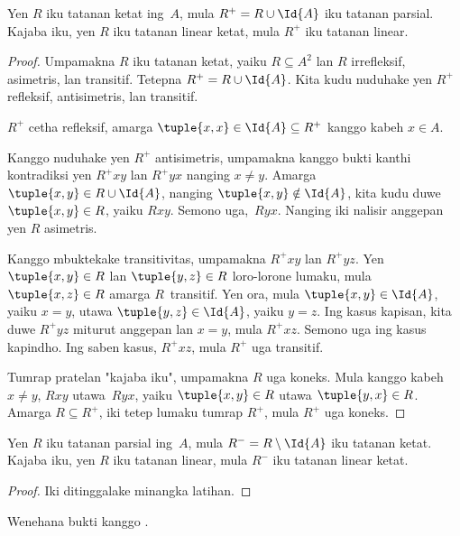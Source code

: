 \documentclass[../../../include/open-logic-section]{subfiles}
\begin{document}
\begin{prop}
Yen $R$ iku tatanan ketat ing~$A$,
mula $R^+ = R \cup \Id{A}$ iku tatanan parsial.
Kajaba iku, yen $R$ iku tatanan linear ketat,
mula $R^+$ iku tatanan linear.
\end{prop}

\begin{proof}
Umpamakna $R$ iku tatanan ketat, yaiku
$R \subseteq A^2$ lan $R$ irrefleksif,
asimetris, lan transitif.
Tetepna $R^+ = R \cup \Id{A}$.
Kita kudu nuduhake yen $R^+$ refleksif,
antisimetris, lan transitif.

$R^+$ cetha refleksif, amarga
$\tuple{x, x} \in \Id{A} \subseteq R^+$
kanggo kabeh $x \in A$.

Kanggo nuduhake yen $R^+$ antisimetris,
umpamakna kanggo bukti kanthi kontradiksi yen
$R^+xy$ lan $R^+yx$ nanging $x \neq y$.
Amarga $\tuple{x,y} \in R \cup \Id{A}$,
nanging $\tuple{x, y} \notin \Id{A}$,
kita kudu duwe $\tuple{x, y} \in R$, yaiku $Rxy$.
Semono uga,~$Ryx$.
Nanging iki nalisir anggepan yen $R$ asimetris.

Kanggo mbuktekake transitivitas, umpamakna
$R^+xy$ lan $R^+yz$.
Yen $\tuple{x, y} \in R$ lan $\tuple{y,z} \in R$
loro-lorone lumaku, mula $\tuple{x, z} \in R$
amarga $R$~transitif.
Yen ora, mula $\tuple{x, y} \in\Id{A}$,
yaiku $x = y$, utawa $\tuple{y, z} \in \Id{A}$,
yaiku $y = z$.
Ing kasus kapisan, kita duwe $R^+yz$ miturut
anggepan lan $x = y$, mula $R^+xz$.
Semono uga ing kasus kapindho.
Ing saben kasus, $R^+xz$, mula $R^+$
uga transitif.

Tumrap pratelan "kajaba iku", umpamakna $R$
uga koneks. Mula kanggo kabeh $x \neq y$,
$Rxy$ utawa~$Ryx$, yaiku
$\tuple{x, y} \in R$ utawa $\tuple{y, x} \in R$.
Amarga $R \subseteq R^+$, iki tetep lumaku
tumrap $R^+$, mula $R^+$ uga koneks.
\end{proof}

\begin{prop}
Yen $R$ iku tatanan parsial ing~$A$,
mula $R^- = R \setminus \Id{A}$ iku tatanan ketat.
Kajaba iku, yen $R$ iku tatanan linear,
mula $R^-$ iku tatanan linear ketat.
\end{prop}

\begin{proof}
Iki ditinggalake minangka latihan.
\end{proof}

\begin{prob}
Wenehana bukti kanggo .
\end{prob}
\end{document}
